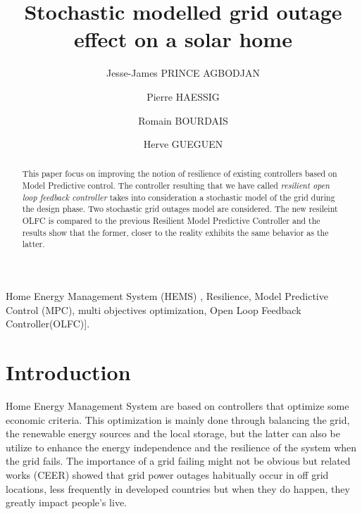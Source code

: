 \documentclass{ifacconf}
\begin{document}
\begin{frontmatter}

\title{Stochastic modelled grid outage effect on a solar home} 

\author[First]{Jesse-James PRINCE AGBODJAN}
\author[First]{Pierre HAESSIG} 
\author[First]{Romain BOURDAIS}
\author[First]{Herve GUEGUEN}

\address[First]{CentraleSupelec CNRS IETR (Institut d'Electronique et de Telecommunications de Rennes), UMR 6164, F-35000 Rennes, France (e-mails : \{jesse-james.prince-agbodjan, pierre.haessig, romain.bourdais, herve.gueguen\}@centralesupelec.fr)}

\begin{abstract}                %
This paper focus on improving the notion of resilience of existing controllers based on Model Predictive control. The controller resulting that we have called \textit{resilient open loop feedback controller} takes into consideration a stochastic model of the grid during the design phase. Two stochastic grid outages model are considered. The new resileint OLFC is compared to the previous Resilient Model Predictive Controller and the results show that the former, closer to the reality exhibits the same behavior as the latter.
\end{abstract}
\begin{keyword}
Home Energy Management System (HEMS) , Resilience, Model Predictive Control (MPC), multi objectives optimization, Open Loop Feedback Controller(OLFC)].
\end{keyword}

\end{frontmatter}

\section{Introduction}
Home Energy Management System are based on controllers that optimize some economic criteria. This optimization is mainly done through balancing the grid, the renewable energy sources and the local storage, but the latter can also be utilize to enhance the energy independence and the resilience of the system when the grid fails. The importance of a grid failing might not be obvious but related works (CEER) showed that grid power outages habitually occur in off grid locations, less frequently in developed countries but when they do happen, they greatly impact people's live.
\end{document}
